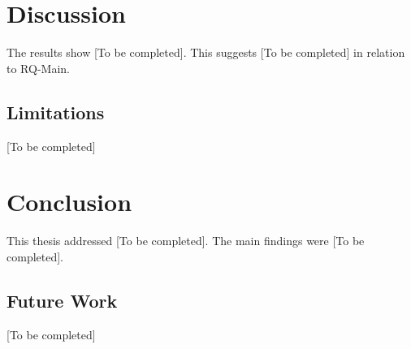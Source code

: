 \documentclass[12pt, a4paper]{report}
\begin{document}
\chapter{Discussion}
\label{ch:discussion}


The results show [To be completed]. This suggests [To be completed] in relation to RQ-Main.

\section{Limitations}
\label{sec:limitations}

[To be completed]

\chapter{Conclusion}
\label{ch:conclusion}

This thesis addressed [To be completed]. The main findings were [To be completed].

\section{Future Work}
\label{sec:future}

[To be completed]


\end{document}
